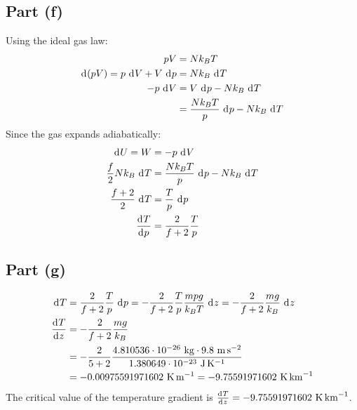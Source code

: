 \documentclass{article}
\begin{document}
\subsection*{Part (f)}
Using the ideal gas law:
\begin{equation}
    \begin{split}
        pV & = Nk_B T \\
        \diff{(pV)} = p \, \diff{V} + V \, \diff{p} & = Nk_B \, \diff{T} \\
        -p \, \diff{V} & = V \, \diff{p} - Nk_B \, \diff{T} \\
        & = \frac{Nk_B T}{p} \, \diff{p} - Nk_B \, \diff{T} \\
    \end{split}
\end{equation}
Since the gas expands adiabatically:
\begin{equation}
    \begin{split}
        \diff{U} = W & = -p \, \diff{V} \\
        \frac{f}{2}Nk_B \, \diff{T} & = \frac{Nk_B T}{p} \, \diff{p} - Nk_B \, \diff{T} \\
        \frac{f + 2}{2} \, \diff{T} & = \frac{T}{p} \, \diff{p} \\
        \deriv{T}{p} & = \frac{2}{f + 2}\frac{T}{p}
    \end{split}
\end{equation}
\subsection*{Part (g)}
\begin{equation}
    \begin{split}
        \diff{T} & = \frac{2}{f + 2}\frac{T}{p} \, \diff{p} = -\frac{2}{f + 2}\frac{T}{p}\frac{mpg}{k_B T} \, \diff{z} = -\frac{2}{f + 2}\frac{mg}{k_B} \, \diff{z} \\
        \deriv{T}{z} & = -\frac{2}{f + 2}\frac{mg}{k_B} \\
        & = -\frac{2}{5 + 2}\frac{4.810536 \cdot 10^{-26}~\unit{\kilo\gram} \cdot 9.8~\unit{\meter\per\second\squared}}{1.380649 \cdot 10^{-23}~\unit{\joule\per\kelvin}} \\
        & = -0.00975591971602~\unit{\kelvin\per\meter} = -9.75591971602~\unit{\kelvin\per\kilo\meter}
    \end{split}
\end{equation}
The critical value of the temperature gradient is $\deriv{T}{z}= -9.75591971602~\unit{\kelvin\per\kilo\meter}$.
\end{document}
